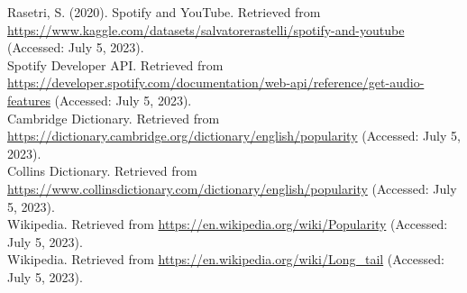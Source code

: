\documentclass[11pt]{article} %
\begin{document}
\begin{thebibliography}{9}
	 Rasetri, S. (2020). Spotify and YouTube. Retrieved from \href{https://www.kaggle.com/datasets/salvatorerastelli/spotify-and-youtube}{https://www.kaggle.com/datasets/salvatorerastelli/spotify-and-youtube} (Accessed: July 5, 2023).\\
	 Spotify Developer API. Retrieved from \href{https://developer.spotify.com/documentation/web-api/reference/get-audio-features}{https://developer.spotify.com/documentation/web-api/reference/get-audio-features} (Accessed: July 5, 2023).\\
	 Cambridge Dictionary. Retrieved from \href{https://dictionary.cambridge.org/dictionary/english/popularity}{https://dictionary.cambridge.org/dictionary/english/popularity} (Accessed: July 5, 2023).\\
	 Collins Dictionary. Retrieved from \href{https://www.collinsdictionary.com/dictionary/english/popularity}{https://www.collinsdictionary.com/dictionary/english/popularity} (Accessed: July 5, 2023).\\
	 Wikipedia. Retrieved from \href{https://en.wikipedia.org/wiki/Popularity}{https://en.wikipedia.org/wiki/Popularity} (Accessed: July 5, 2023).\\
	 Wikipedia. Retrieved from \href{https://en.wikipedia.org/wiki/Long_tail}{https://en.wikipedia.org/wiki/Long\_tail} (Accessed: July 5, 2023).\\
\end{thebibliography}
\end{document}
